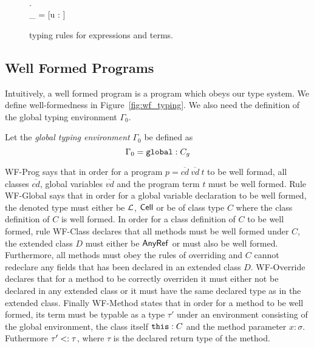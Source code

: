 \begin{figure}[h!]
    \vspace{0.5em}

    { \andalso {} \\
    \forall {} \in {}. \; \\
    \Gamma_{} = [u \mapsto \CellType :  \in {}]\\
    }
    {  }

  \caption{\RACL{} typing rules for expressions and terms.}
  \label{fig:expr_typing}
\end{figure}

\subsection{Well Formed Programs}%
\label{sub:well_formed_programs}

Intuitively, a well formed program is a program which obeys our type system. We
define well-formedness in Figure~\ref{fig:wf_typing}. We also need the
definition of the global typing environment $\Gamma_0$. 
\begin{definition}
  Let the \emph{global typing environment} $\Gamma_0$ be defined as 
  \begin{equation*}
    \Gamma_0 = \mbox{\mdseries\texttt{global}} : C_g
  \end{equation*}
\end{definition}
{\sc WF-Prog} says that in order for a program $p =
\overline{cd}~\overline{vd}~t$ to be well formad, all classes $\overline{cd}$,
global variables $\overline{vd}$ and the program term $t$ must be well formed.
Rule {\sc WF-Global} says that in order for a global variable declaration to be
well formed, the denoted type must either be $\mbox{$\mathcal{L}$}$, $\mbox{$\mathsf{Cell}$}$ or be of
class type $C$ where the class definition of $C$ is well formed. In order for a
class definition of $C$ to be well formed, rule {\sc WF-Class} declares that all
methods must be well formed under $C$, the extended class $D$ must either be
$\mbox{$\mathsf{AnyRef}$}$ or must also be well formed. Furthermore, all methods must obey the
rules of overriding and $C$ cannot redeclare any fields that has been declared
in an extended class $D$. {\sc WF-Override} declares that for a method to be
correctly overriden it must either not be declared in any extended class or it
must have the same declared type as in the extended class. Finally {\sc
WF-Method} states that in order for a method to be well formed, its term must be
typable as a type $\tau'$ under an environment consisting of the global
environment, the class itself $\mbox{\mdseries\texttt{this}} : C$ and the method parameter $x: \sigma$.
Futhermore $\tau' <: \tau$, where $\tau$ is the declared return type of the
method.



